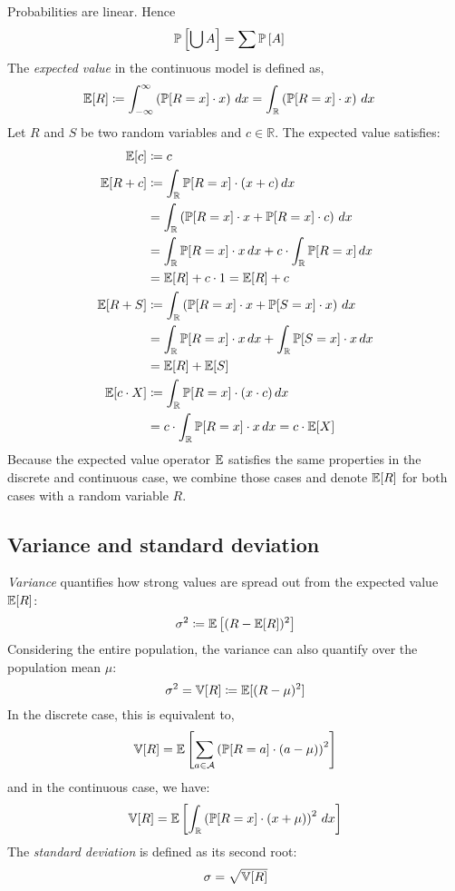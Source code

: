 Probabilities are linear. Hence
\begin{align}
  \mathbb P\left[\bigcup A\right] &= \sum \mathbb P\left[A\right] \label{eq:prob-linear}
\end{align}
%
The \emph{expected value} in the continuous model is defined as,
%
\begin{align}
  \mathbb E[R] &\coloneqq \int_{-\infty}^\infty \left(\mathbb P[R=x] \cdot x\right) \, dx = \int_{\mathbb R} \left(\mathbb P[R=x] \cdot x\right) \, dx
\end{align}
%
Let $R$ and $S$ be two random variables and $c \in \mathbb R$.
The expected value satisfies:
%
\begin{align}
  \mathbb E[c]     &\coloneqq c \label{eq:Ec} \\
  \mathbb E[R + c] &\coloneqq \int_{\mathbb R} \mathbb P[R=x] \cdot (x + c) \, dx \notag\\
            &= \int_{\mathbb R} \left(\mathbb P[R=x] \cdot x + \mathbb P[R=x] \cdot c\right) \, dx \notag\\
            &= \int_{\mathbb R} \mathbb P[R=x] \cdot x \, dx + c \cdot \int_{\mathbb R} \mathbb P[R=x] \, dx \notag\\
            &= \mathbb E[R] + c \cdot 1 = \mathbb E[R] + c \\
  \mathbb E[R + S] &\coloneqq \int_{\mathbb R} \left(\mathbb P[R=x] \cdot x + \mathbb P[S=x] \cdot x\right) \, dx \notag\\
            &= \int_{\mathbb R} \mathbb P[R=x] \cdot x \, dx + \int_{\mathbb R} \mathbb P[S=x] \cdot x \, dx \notag\\
            &= \mathbb E[R] + \mathbb E[S] \label{eq:Evv} \\
  \mathbb E[c \cdot X] &\coloneqq \int_{\mathbb R} \mathbb P[R=x] \cdot (x \cdot c) \, dx \notag\\
            &= c \cdot \int_{\mathbb R} \mathbb P[R=x] \cdot x \, dx
            = c \cdot \mathbb E[X] \label{eq:Ecv}
\end{align}
%
Because the expected value operator $\mathbb E$ satisfies the same properties in the discrete and continuous case,
we combine those cases and denote $\mathbb E[R]$ for both cases with a random variable $R$.

\subsection{Variance and standard deviation}
\label{sec:bp-var-sd}
%
\emph{Variance} quantifies how strong values are spread out from the expected value $\mathbb E[R]$:
\[ \sigma^2 \coloneqq \mathbb E\left[(R - \mathbb E[R])^2\right] \]
Considering the entire population, the variance can also quantify over the population mean $\mu$:
\[ \sigma^2 = \mathbb V[R] \coloneqq \mathbb E[(R - \mu)^2] \]
In the discrete case, this is equivalent to,
\[ \mathbb V[R] = \mathbb E\left[\sum_{a \in \mathcal A} \left(\mathbb P[R=a] \cdot (a - \mu)\right)^2\right] \]
and in the continuous case, we have:
\[ \mathbb V[R] = \mathbb E\left[\int_{\mathbb R} \left(\mathbb P[R=x] \cdot (x + \mu)\right)^2 \, dx\right] \]
The \emph{standard deviation} is defined as its second root:
\[ \sigma = \sqrt{\mathbb V[R]} \]

